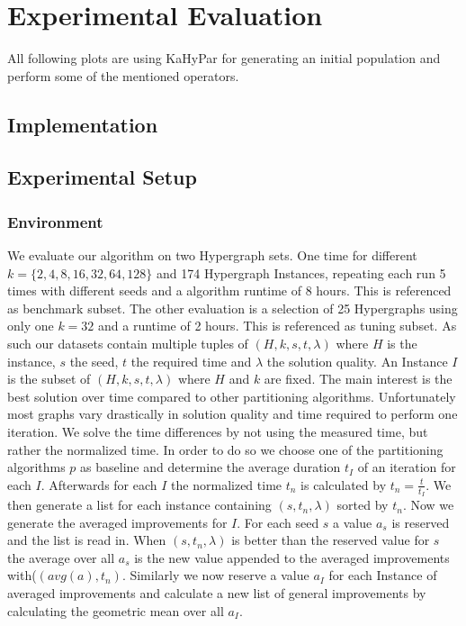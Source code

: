 \documentclass[a4paper,12pt,bibtotoc,titlepage, liststotoc,BCOR7mm,headsepline,pointlessnumbers]{scrbook}
\numberwithin{equation}{section}
\begin{document}
\chapter{Experimental Evaluation}

All following plots are using KaHyPar for generating an initial population and perform some of the mentioned operators.












\section{Implementation}
\section{Experimental Setup}
\subsection{Environment}
We evaluate our algorithm on two Hypergraph sets. One time for different $k = \{2,4,8,16,32,64,128\}$ and 174 Hypergraph Instances, repeating
each run 5 times with different seeds and a algorithm runtime of 8 hours. This is referenced as benchmark subset. The other evaluation is a
selection of 25 Hypergraphs using only one $k = 32$ and a runtime of 2 hours. This is referenced as tuning subset. 
As such our datasets contain multiple tuples of $(H, k, s, t, \lambda)$ where $H$ is the instance, $s$ the seed, $t$ the required time and $\lambda$ the solution quality. An Instance $I$ is the subset of $(H, k, s, t, \lambda)$ where $H$ and $k$ are fixed.
The main interest is the best solution over time compared to other partitioning algorithms. Unfortunately most graphs vary drastically in solution quality and time required to perform one iteration. We solve the time differences by not using the measured time, but rather the normalized time. 
In order to do so we choose one of the partitioning algorithms $p$ as baseline and determine the average duration $t_I$ of an iteration for each $I$. Afterwards for each $I$ the normalized time $t_n$ is calculated by $t_n = \frac{t}{t_I}$. We then generate a list for each instance containing $(s, t_n, \lambda)$ sorted by $t_n$. Now we generate the averaged improvements for $I$. For each seed $s$ a value $a_s$ is reserved and the list is read in. When $(s, t_n, \lambda)$ is better than the reserved value for $s$ the average over all $a_s$ 
is the new value appended to the averaged improvements with($(avg(a), t_n)$. Similarly we now reserve a value $a_I$ for each Instance of averaged improvements and calculate a new list of general improvements by calculating the geometric mean over all $a_I$. 
\end{document}
